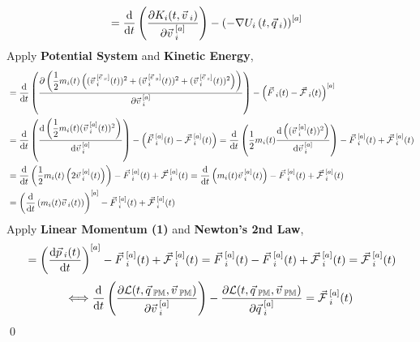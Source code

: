\documentclass[12pt]{amsart}
\renewenvironment{proof}{{\bfseries Proof.}}{\qed}
\let\oldvec\vec
\renewcommand{\vec}[1]{\oldvec{#1}\hspace{0.1em}}
\begin{document}
\begin{proof}
\begin{align*}
& = \dfrac{\mathrm{d}}{\mathrm{d} t} \left ( \dfrac{\partial K_i (t, \vec{v}_i)}{\partial \vec{v}^{[a]}_i} \right ) - \left ( - \nabla U_i \left ( t, \vec{q}_i \right ) \right )^{[a]}
\end{align*}
Apply \textbf{Potential System} and \textbf{Kinetic Energy},
\begin{align*}
& = \dfrac{\mathrm{d}}{\mathrm{d} t} \left ( \dfrac{\partial \left ( \dfrac{1}{2} m_i (t) \left ( (\vec{v}_i^{[\vec{e}_{x}]}(t))^2+ (\vec{v}_i^{[\vec{e}_{y}]}(t))^2+ (\vec{v}_i^{[\vec{e}_{z}]}(t))^2 \right ) \right )}{\partial \vec{v}^{[a]}_i}  \right ) - \left (\vec{F}_i (t) - \vec{\mathcal{F}}_i (t) \right )^{[a]}  \\
& = \dfrac{\mathrm{d}}{\mathrm{d} t} \left ( \dfrac{\mathrm{d} \left ( \dfrac{1}{2} m_i (t) (\vec{v}_i^{[a]} (t))^2 \right )}{\mathrm{d} \vec{v}_i^{[a]}}  \right ) - \left (\vec{F}^{[a]}_i (t) - \vec{\mathcal{F}}^{[a]}_i (t)\right ) = \dfrac{\mathrm{d}}{\mathrm{d} t} \left ( \dfrac{1}{2} m_i (t) \dfrac{\mathrm{d} \left ( (\vec{v}_i^{[a]} (t))^2 \right )}{\mathrm{d} \vec{v}_i^{[a]}}  \right ) - \vec{F}^{[a]}_i (t) + \vec{\mathcal{F}}^{[a]}_i (t)  \\
& = \dfrac{\mathrm{d}}{\mathrm{d} t} \left ( \dfrac{1}{2} m_i (t) \left ( 2 \vec{v}_i^{[a]}(t) \right )  \right ) - \vec{F}^{[a]}_i (t) + \vec{\mathcal{F}}^{[a]}_i (t)= \dfrac{\mathrm{d}}{\mathrm{d} t} \left (  m_i (t)  \vec{v}_i^{[a]}(t) \right ) - \vec{F}^{[a]}_i (t) + \vec{\mathcal{F}}^{[a]}_i (t)  \\
& = \left ( \dfrac{\mathrm{d}}{\mathrm{d} t} \left (  m_i (t)  \vec{v}_i (t) \right ) \right )^{[a]} - \vec{F}^{[a]}_i (t) + \vec{\mathcal{F}}^{[a]}_i (t)  \\
    \end{align*}
Apply \textbf{Linear Momentum (1)} and \textbf{Newton's 2nd Law},
    \begin{align*}
& = \left ( \dfrac{\mathrm{d} \vec{p}_i (t)}{\mathrm{d} t} \right )^{[a]} - \vec{F}^{[a]}_i (t) + \vec{\mathcal{F}}^{[a]}_i (t) = \vec{F}_i^{[a]} (t) - \vec{F}^{[a]}_i (t) + \vec{\mathcal{F}}^{[a]}_i (t) = \vec{\mathcal{F}}^{[a]}_i (t) \\
    \end{align*}
    $$\Longleftrightarrow  \dfrac{\mathrm{d}}{\mathrm{d}  t} \left ( \dfrac{\partial \mathcal{L} (t, \vec{q}_\mathbb{PM}, \vec{v}_\mathbb{PM})}{\partial \vec{v}^{[a]}_i}  \right ) - \dfrac{\partial \mathcal{L} (t, \vec{q}_\mathbb{PM}, \vec{v}_\mathbb{PM})}{\partial \vec{q}^{[a]}_i } = \vec{\mathcal{F}}^{[a]}_i (t)$$
\end{proof}
\end{document}
